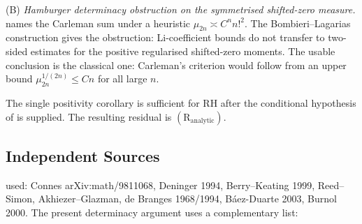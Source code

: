(B) \emph{Hamburger determinacy obstruction on the symmetrised shifted-zero
measure.}
 names the Carleman
sum under a heuristic \(\mu_{2n}\asymp C^{n}n!^{2}\). The
Bombieri--Lagarias construction gives the obstruction:
Li-coefficient bounds do not transfer to
two-sided estimates for the positive regularised shifted-zero moments.
The usable conclusion is the classical one: Carleman's criterion would
follow from an upper bound \(\mu_{2n}^{1/(2n)}\le Cn\) for all large
\(n\).

The single positivity corollary
 is sufficient for RH
after the conditional hypothesis of
 is supplied. The resulting
residual is \((\mathrm{R}_{\mathrm{analytic}})\).

\subsection{Independent Sources}
\label{v4-arith:hpar-det:sources}

 used: Connes arXiv:math/9811068, Deninger 1994, Berry--Keating
1999, Reed--Simon, Akhiezer--Glazman, de Branges 1968/1994,
B\'aez-Duarte 2003, Burnol 2000. The present determinacy argument uses
a complementary list:

